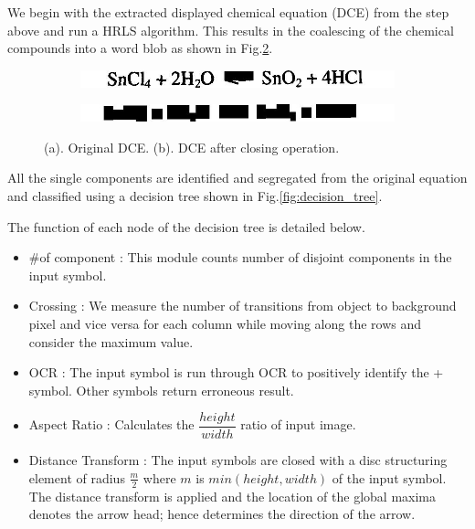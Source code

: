 \documentclass[conference]{IEEEtran}
\begin{document}
We begin with the extracted displayed chemical equation (DCE) from the step above and run a HRLS algorithm. 
This results in the coalescing of the chemical compounds into a word blob as shown in Fig.\ref{fig:blob_equ}. 

\begin{figure}[h!]

\begin{subfigure}{0.5\textwidth}
\centering 
\includegraphics[width=0.9\linewidth]{original_equ} 
\caption{}
\label{fig:org_equ}
\end{subfigure}

\begin{subfigure}{0.5\textwidth}
\centering 
\includegraphics[width=0.92\linewidth]{blob_equ}
\caption{}
\label{fig:blob_equ}
\end{subfigure}
 
\caption{(a). Original DCE. (b). DCE after closing operation.}
\label{fig:image2}

\end{figure}

%


All the single components are identified and segregated from the original equation and classified using a decision tree shown in Fig.\ref{fig:decision_tree}.


The function of each node of the decision tree is detailed below.
\begin{itemize}
\item
\#of component : This module counts number of disjoint components in the input symbol.
\item
Crossing : We measure the number of transitions from object to background pixel and vice versa for each column while moving along the rows and consider the maximum value. 
\item
OCR : The input symbol is run through OCR to positively identify the + symbol. Other symbols return erroneous result.
\item
Aspect Ratio : Calculates the $\dfrac{height}{width}$ ratio of input image. 
\item
Distance Transform :  The input symbols are closed with a disc structuring element of radius $\frac{m}{2}$ where $m$ is $min(height,width)$ of the input symbol. The distance transform is applied and the location of the global maxima denotes the arrow head; hence determines the direction of the arrow.
\end{itemize}
\end{document}
